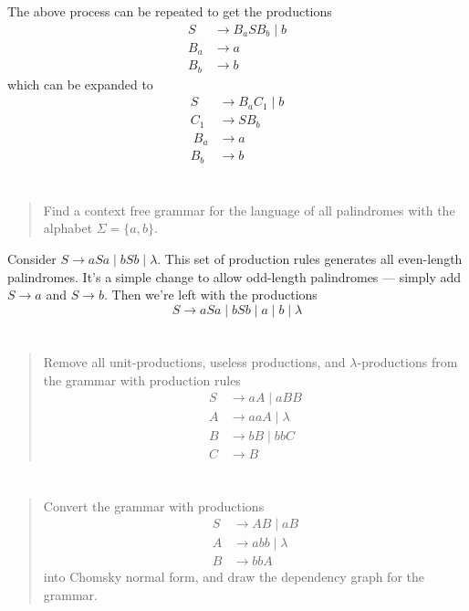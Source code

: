 \documentclass{article}
\begin{document}
The above process can be repeated to get the productions
\begin{align*}
    S   & \to B_a S B_b \mid b \\
    B_a & \to a                \\
    B_b & \to b
\end{align*}
which can be expanded to
\begin{align*}
    S   & \to B_a C_1 \mid b \\
    C_1 & \to S B_b          \\\
    B_a & \to a              \\
    B_b & \to b
\end{align*}

\section{}
\begin{quote}
    Find a context free grammar for the language of all palindromes with the alphabet $\Sigma = \{a, b\}$.
\end{quote}

Consider $S \to aSa \mid bSb \mid \lambda$.
This set of production rules generates all even-length palindromes.
It's a simple change to allow odd-length palindromes --- simply add $S \to a$ and $S \to b$.
Then we're left with the productions
\[S \to aSa \mid bSb \mid a \mid b \mid \lambda \]

\section{}
\begin{quote}
    Remove all unit-productions, useless productions, and $\lambda$-productions from the grammar with production rules
    \begin{align*}
        S & \to aA \mid aBB      \\
        A & \to aaA \mid \lambda \\
        B & \to bB \mid bbC      \\
        C & \to B
    \end{align*}
\end{quote}

\section{}
\begin{quote}
    Convert the grammar with productions
    \begin{align*}
        S & \to AB \mid aB       \\
        A & \to abb \mid \lambda \\
        B & \to bbA
    \end{align*}
    into Chomsky normal form, and draw the dependency graph for the grammar.
\end{quote}
\end{document}
